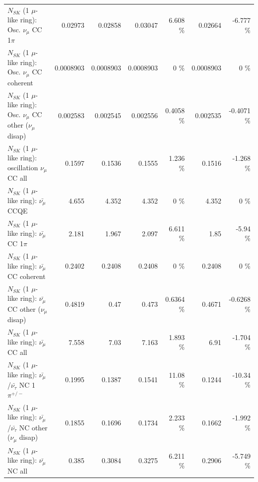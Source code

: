 \begin{table}
\begin{tabular}{| l | r | r | r  r | r  r |}
                          $N_{SK}$ (1 $\mu$-like ring): Osc. $\nu_\mu$ CC 1$\pi$ &         0.02973 &         0.02858 &         0.03047 &    6.608 \%  &         0.02664 &   -6.777 \%  \\ 
                        $N_{SK}$ (1 $\mu$-like ring): Osc. $\nu_\mu$ CC coherent &       0.0008903 &       0.0008903 &       0.0008903 &        0 \%  &       0.0008903 &        0 \%  \\ 
         $N_{SK}$ (1 $\mu$-like ring): Osc. $\nu_\mu$ CC other ($\nu_\mu$ disap) &        0.002583 &        0.002545 &        0.002556 &   0.4058 \%  &        0.002535 &  -0.4071 \%  \\ 
                      $N_{SK}$ (1 $\mu$-like ring): oscillation $\nu_\mu$ CC all &          0.1597 &          0.1536 &          0.1555 &    1.236 \%  &          0.1516 &   -1.268 \%  \\ 
\hline
\hline
                              $N_{SK}$ (1 $\mu$-like ring): $\bar{\nu_\mu}$ CCQE &           4.655 &           4.352 &           4.352 &        0 \%  &           4.352 &        0 \%  \\ 
                         $N_{SK}$ (1 $\mu$-like ring): $\bar{\nu_\mu}$ CC 1$\pi$ &           2.181 &           1.967 &           2.097 &    6.611 \%  &            1.85 &    -5.94 \%  \\ 
                       $N_{SK}$ (1 $\mu$-like ring): $\bar{\nu_\mu}$ CC coherent &          0.2402 &          0.2408 &          0.2408 &        0 \%  &          0.2408 &        0 \%  \\ 
        $N_{SK}$ (1 $\mu$-like ring): $\bar{\nu_\mu}$ CC other ($\nu_\mu$ disap) &          0.4819 &            0.47 &           0.473 &   0.6364 \%  &          0.4671 &  -0.6268 \%  \\ 
                          $N_{SK}$ (1 $\mu$-like ring): $\bar{\nu_{\mu}}$ CC all &           7.558 &            7.03 &           7.163 &    1.893 \%  &            6.91 &   -1.704 \%  \\ 
\hline
  $N_{SK}$ (1 $\mu$-like ring): $\bar{\nu_\mu}$/$\bar{\nu_\tau}$ NC 1$\pi^{+/-}$ &          0.1995 &          0.1387 &          0.1541 &    11.08 \%  &          0.1244 &   -10.34 \%  \\ 
$N_{SK}$ (1 $\mu$-like ring): $\bar{\nu_\mu}$/$\bar{\nu_\tau}$ NC other ($\nu_\mu$ disap) &          0.1855 &          0.1696 &          0.1734 &    2.233 \%  &          0.1662 &   -1.992 \%  \\ 
                          $N_{SK}$ (1 $\mu$-like ring): $\bar{\nu_{\mu}}$ NC all &           0.385 &          0.3084 &          0.3275 &    6.211 \%  &          0.2906 &   -5.749 \%  \\ 

\end{tabular}
\end{table}
